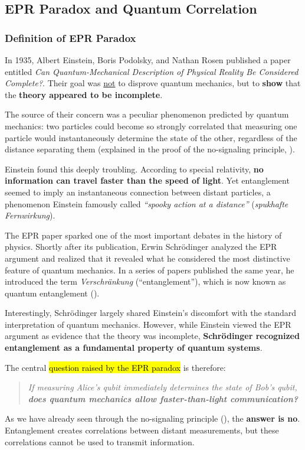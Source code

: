 \subsection{EPR Paradox and Quantum Correlation}

\subsubsection{Definition of EPR Paradox}

In 1935, Albert Einstein, Boris Podolsky, and Nathan Rosen published a paper entitled \emph{Can Quantum-Mechanical Description of Physical Reality Be Considered Complete?}.\cite{einstein1935can} Their goal was \underline{not} to disprove quantum mechanics, but to \textbf{show} that the \textbf{theory appeared to be incomplete}.

\highspace
The source of their concern was a peculiar phenomenon predicted by quantum mechanics: two particles could become so strongly correlated that measuring one particle would instantaneously determine the state of the other, regardless of the distance separating them (explained in the proof of the no-signaling principle, ).

\highspace
Einstein found this deeply troubling. According to special relativity, \textbf{no information can travel faster than the speed of light}. Yet entanglement seemed to imply an instantaneous connection between distant particles, a phenomenon Einstein famously called \emph{``spooky action at a distance''} (\emph{spukhafte Fernwirkung}).

\highspace
The EPR paper sparked one of the most important debates in the history of physics. Shortly after its publication, Erwin Schrödinger analyzed the EPR argument and realized that it revealed what he considered the most distinctive feature of quantum mechanics. In a series of papers published the same year, he introduced the term \emph{Verschränkung} (``entanglement''), which is now known as quantum entanglement ().

\highspace
Interestingly, Schrödinger largely shared Einstein's discomfort with the standard interpretation of quantum mechanics. However, while Einstein viewed the EPR argument as evidence that the theory was incomplete, \textbf{Schrödinger recognized entanglement as a fundamental property of quantum systems}.

\highspace
The central \hl{question raised by the EPR paradox} is therefore:
\begin{quote}
    \emph{If measuring Alice's qubit immediately determines the state of Bob's qubit, \textbf{does quantum mechanics allow faster-than-light communication?}}
\end{quote}
As we have already seen through the no-signaling principle (), the \textbf{answer is no}. Entanglement creates correlations between distant measurements, but these correlations cannot be used to transmit information.

